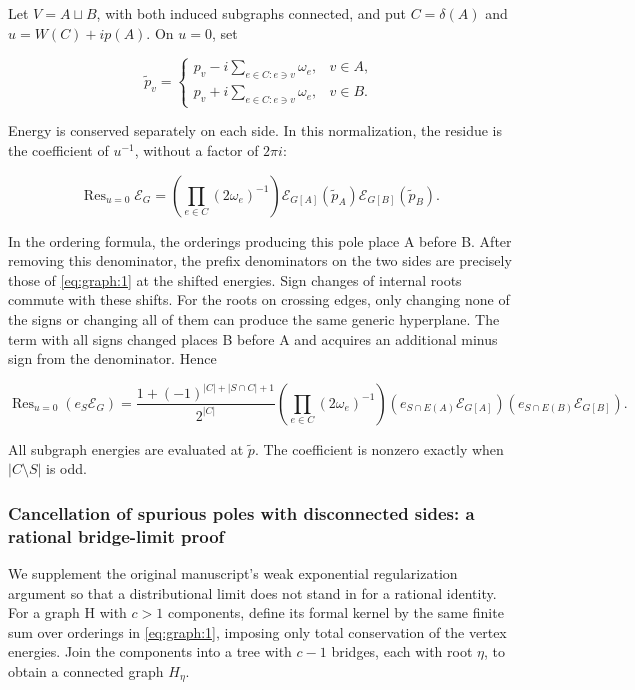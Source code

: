 \documentclass[11pt,a4paper,oneside]{article}
\theoremstyle{plain}
\theoremstyle{definition}
\theoremstyle{remark}
\numberwithin{equation}{section}
\begin{document}
Let \(V=A\sqcup B\), with both induced subgraphs connected, and put \(C=\delta(A)\) and \(u=W(C)+ip(A)\). On \(u=0\), set

\begin{equation}
\widetilde p_v=
 \begin{cases}
 p_v-i\sum_{e\in C:e\ni v}\omega_e,&v\in A,\\
 p_v+i\sum_{e\in C:e\ni v}\omega_e,&v\in B.
 \end{cases}
\end{equation}

Energy is conserved separately on each side. In this normalization, the residue is the coefficient of \(u^{-1}\), without a factor of \(2\pi i\):

\begin{equation}
\operatorname{Res}_{u=0}\mathscr E_G
 =\left(\prod_{e\in C}(2\omega_e)^{-1}\right)
   \mathscr E_{G[A]}(\widetilde p_A)
   \mathscr E_{G[B]}(\widetilde p_B).                         \label{eq:graph:3}
\end{equation}

In the ordering formula, the orderings producing this pole place A before B. After removing this denominator, the prefix denominators on the two sides are precisely those of \eqref{eq:graph:1} at the shifted energies. Sign changes of internal roots commute with these shifts. For the roots on crossing edges, only changing none of the signs or changing all of them can produce the same generic hyperplane. The term with all signs changed places B before A and acquires an additional minus sign from the denominator. Hence

\begin{equation}
\operatorname{Res}_{u=0}(e_S\mathscr E_G)=
 \frac{1+(-1)^{|C|+|S\cap C|+1}}{2^{|C|}}
 \left(\prod_{e\in C}(2\omega_e)^{-1}\right)
 (e_{S\cap E(A)}\mathscr E_{G[A]})
 (e_{S\cap E(B)}\mathscr E_{G[B]}).                         \label{eq:graph:4}
\end{equation}

All subgraph energies are evaluated at \(\widetilde p\). The coefficient is nonzero exactly when \(|C\setminus S|\) is odd.

\subsubsection{Cancellation of spurious poles with disconnected sides: a rational bridge-limit proof}\label{sec:graph:2.2}

We supplement the original manuscript's weak exponential regularization argument so that a distributional limit does not stand in for a rational identity. For a graph H with \(c>1\) components, define its formal kernel by the same finite sum over orderings in \eqref{eq:graph:1}, imposing only total conservation of the vertex energies. Join the components into a tree with \(c-1\) bridges, each with root \(\eta\), to obtain a connected graph \(H_\eta\).
\end{document}

